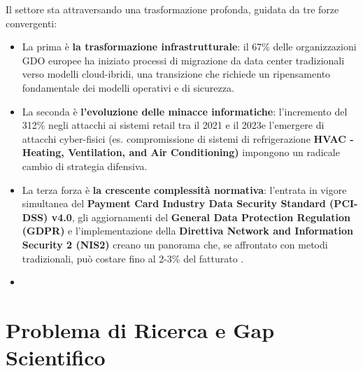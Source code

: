 Il settore sta attraversando una trasformazione profonda, guidata da tre forze convergenti: 
\begin{itemize}
	\item La prima è \textbf{la trasformazione infrastrutturale}: il 67\% delle organizzazioni GDO europee ha iniziato processi di migrazione da data center tradizionali verso modelli cloud-ibridi\autocite{gartner2024cloud}, una transizione che richiede un ripensamento fondamentale dei modelli operativi e di sicurezza.
	\item La seconda è \textbf{l'evoluzione delle minacce informatiche}: l'incremento del 312\% negli attacchi ai sistemi retail tra il 2021 e il 2023\autocite{enisa2024retail}e l'emergere di attacchi cyber-fisici (es. compromissione di sistemi di refrigerazione \textbf{HVAC - Heating, Ventilation, and Air Conditioning)} impongono un radicale cambio di strategia difensiva. 
	\item La terza forza è \textbf{la crescente complessità normativa}: l'entrata in vigore simultanea del \textbf{Payment Card Industry Data Security Standard (PCI-DSS) v4.0}, gli aggiornamenti del \textbf{General Data Protection Regulation (GDPR)} e l'implementazione della \textbf{Direttiva Network and Information Security 2 (NIS2)} creano un panorama che, se affrontato con metodi tradizionali, può costare fino al 2-3\% del fatturato \autocite{ponemon2024compliance}.
	\item 
\end{itemize}
\section{Problema di Ricerca e Gap Scientifico}

